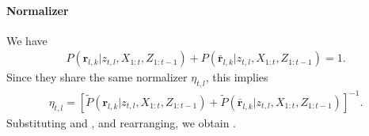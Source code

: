 \paragraph{Normalizer}
We have 
\begin{align*}
P(\mathbf{r}_{l,k}|z_{t,l},X_{1:t},Z_{1:t-1})+
P(\bar{\mathbf{r}}_{l,k}|z_{t,l},X_{1:t},Z_{1:t-1})=1.
\end{align*}
Since they share the same normalizer $\eta_{t,l}$, this implies 
\begin{align*}
\eta_{t,l}=[\tilde P(\mathbf{r}_{l,k}|z_{t,l},X_{1:t},Z_{1:t-1})+
\tilde P(\bar{\mathbf{r}}_{l,k}|z_{t,l},X_{1:t},Z_{1:t-1})]^{-1}.
\end{align*}
Substituting  and , and rearranging, we obtain .





